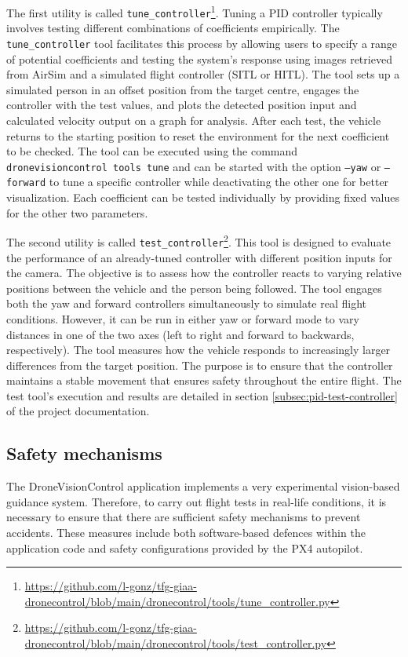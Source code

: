 The first utility is called \texttt{tune\_controller}\footnote{\url{https://github.com/l-gonz/tfg-giaa-dronecontrol/blob/main/dronecontrol/tools/tune_controller.py}}. Tuning a PID controller typically involves testing different combinations of coefficients empirically. The \texttt{tune\_controller} tool facilitates this process by allowing users to specify a range of potential coefficients and testing the system's response using images retrieved from AirSim and a simulated flight controller (SITL or HITL). The tool sets up a simulated person in an offset position from the target centre, engages the controller with the test values, and plots the detected position input and calculated velocity output on a graph for analysis. After each test, the vehicle returns to the starting position to reset the environment for the next coefficient to be checked. The tool can be executed using the command \texttt{dronevisioncontrol tools tune} and can be started with the option \texttt{--yaw} or \texttt{--forward} to tune a specific controller while deactivating the other one for better visualization. Each coefficient can be tested individually by providing fixed values for the other two parameters.

The second utility is called \texttt{test\_controller}\footnote{\url{https://github.com/l-gonz/tfg-giaa-dronecontrol/blob/main/dronecontrol/tools/test_controller.py}}. This tool is designed to evaluate the performance of an already-tuned controller with different position inputs for the camera. The objective is to assess how the controller reacts to varying relative positions between the vehicle and the person being followed. The tool engages both the yaw and forward controllers simultaneously to simulate real flight conditions. However, it can be run in either yaw or forward mode to vary distances in one of the two axes (left to right and forward to backwards, respectively). The tool measures how the vehicle responds to increasingly larger differences from the target position. The purpose is to ensure that the controller maintains a stable movement that ensures safety throughout the entire flight. The test tool's execution and results are detailed in section \ref{subsec:pid-test-controller} of the project documentation.

\subsection{Safety mechanisms}
\label{subsec:safety}

The DroneVisionControl application implements a very experimental vision-based guidance system.
Therefore, to carry out flight tests in real-life conditions, it is necessary to ensure that there are sufficient safety mechanisms to prevent accidents.
These measures include both software-based defences within the application code and safety configurations provided by the PX4 autopilot.

